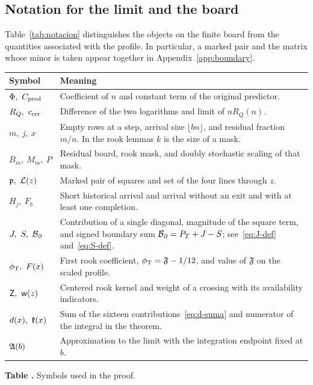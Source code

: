\subsection{Notation for the limit and the board}\label{sec:notacion}
Table~\ref{tab:notacion} distinguishes the objects on the finite board from the quantities associated
with the profile. In particular, a marked pair and the matrix whose minor is taken appear together in
Appendix~\ref{app:boundary}.
\begin{center}
\small
\begin{tabular}{@{}L{.21\linewidth}L{.72\linewidth}@{}}
\toprule Symbol & Meaning\\ \midrule
\(\Phi,\ C_{\rm pred}\) & Coefficient of \(n\) and constant term of the original predictor.\\
\(R_Q,\ c_{\mathrm{err}}\) & Difference of the two logarithms and limit of \(nR_Q(n)\).\\
\(m,\ j,\ x\) & Empty rows at a step, arrival size \(\lfloor bn\rfloor\), and residual fraction \(m/n\).
In the rook lemmas \(k\) is the size of a mask.\\
\(B_m,\ M_m,\ P\) & Residual board, rook mask, and doubly stochastic scaling of that mask.\\
\(\mathfrak p,\ \mathcal L(z)\) & Marked pair of squares and set of the four lines through \(z\).\\
\(H_j,\ F_b\) & Short historical arrival and arrival without an exit and with at least one completion.\\
\(J,\ S,\ \mathcal B_{\partial}\) & Contribution of a single diagonal, magnitude of the square term, and signed
boundary sum \(\mathcal B_{\partial}=P_T+J-S\); see~\eqref{eq:J-def} and~\eqref{eq:S-def}.\\
\(\phi_{\mathrm T},\ F(x)\) & First rook coefficient, \(\phi_{\mathrm T}=\mathfrak F-1/12\), and value of \(\mathfrak F\) on
the scaled profile.\\
\(\mathsf Z,\ \mathsf w(z)\) & Centered rook kernel and weight of a crossing with its availability
indicators.\\
\(d(x),\ \mathfrak{k}(x)\) & Sum of the sixteen contributions~\eqref{eq:d-suma} and numerator of the
integral in the theorem.\\
\(\mathfrak A(b)\) & Approximation to the limit with the integration endpoint fixed at \(b\).\\
\bottomrule
\end{tabular}
\label{tab:notacion}\par\smallskip
\textbf{Table \thetable.} Symbols used in the proof.
\end{center}
